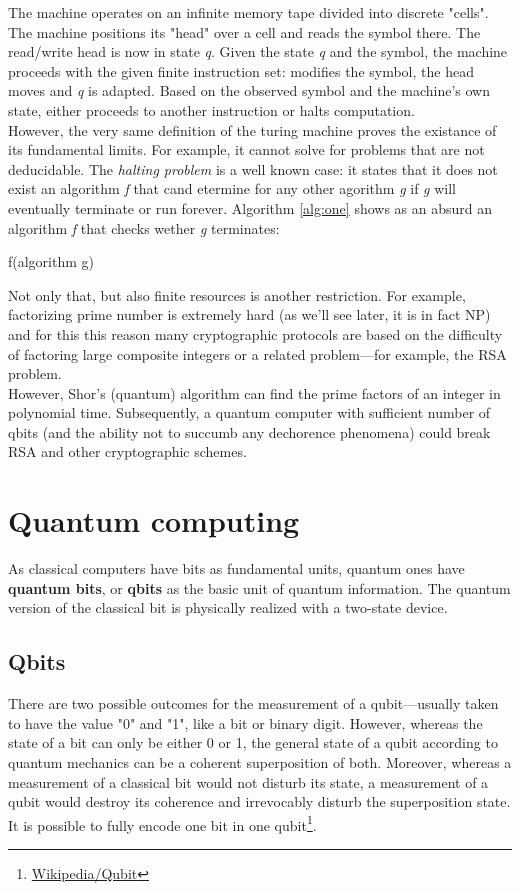 The machine operates on an infinite memory tape divided into discrete "cells". The machine positions its "head" over a cell and reads the symbol there. The read/write head is now in state \textit{q}. Given the state \textit{q} and the symbol, the machine proceeds with the given finite instruction set: modifies the symbol, the head moves and \textit{q} is adapted. Based on the observed symbol and the machine's own state, either proceeds to another instruction or halts computation.\\
However, the very same definition of the turing machine proves the existance of its fundamental limits. For example, it cannot solve for problems that are not deducidable. The \textit{halting problem} is a well known case: it states that it does not exist an algorithm \textit{f} that cand etermine for any other agorithm \textit{g} if \textit{g} will eventually terminate or run forever. Algorithm \ref{alg:one} shows as an absurd an algorithm \textit{f} that checks wether \textit{g} terminates:

\begin{algorithm}
\caption{f(algorithm g)}\label{alg:one}
{
}\Else{\Return}
\end{algorithm}
Not only that, but also finite resources is another restriction. For example, factorizing prime number is extremely hard (as we'll see later, it is in fact NP) and for this this reason many cryptographic protocols are based on the difficulty of factoring large composite integers or a related problem—for example, the RSA problem. \\
However, Shor's (quantum) algorithm can find the prime factors of an integer in polynomial time. Subsequently, a quantum computer with sufficient number of qbits (and the ability not to succumb any dechorence phenomena) could break RSA and other cryptographic schemes.\\ 

\section{Quantum computing}
As classical computers have bits as fundamental units, quantum ones have \textbf{quantum bits}, or \textbf{qbits} as the basic unit of quantum information. The quantum version of the classical bit is physically realized with a two-state device. 
\subsection{Qbits}
There are two possible outcomes for the measurement of a qubit—usually taken to have the value "0" and "1", like a bit or binary digit. However, whereas the state of a bit can only be either 0 or 1, the general state of a qubit according to quantum mechanics can be a coherent superposition of both. Moreover, whereas a measurement of a classical bit would not disturb its state, a measurement of a qubit would destroy its coherence and irrevocably disturb the superposition state. It is possible to fully encode one bit in one qubit\footnote{\href{https://en.wikipedia.org/wiki/Qubit}{Wikipedia/Qubit}}.\\
